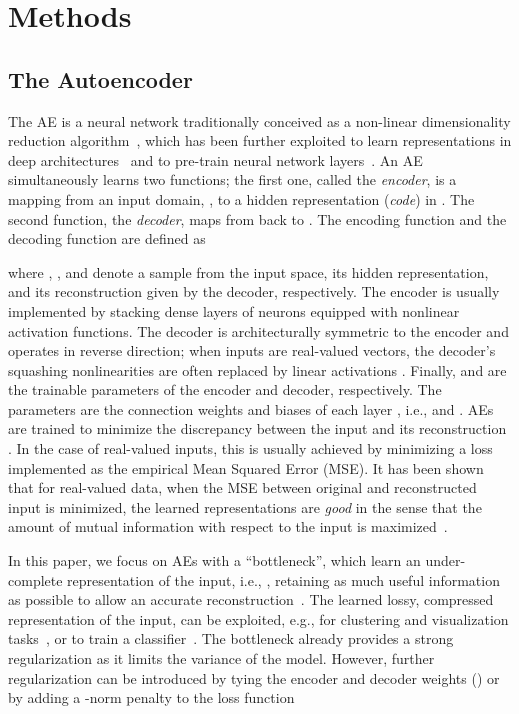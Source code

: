 \documentclass[a4paper,10pt,pdftex]{article}
\begin{document}
\section{Methods}
\label{sec:methods}

\subsection{The Autoencoder}
\label{sec:ae}

The AE is a neural network traditionally conceived as a non-linear dimensionality reduction algorithm~\cite{Hinton504}, which has been further exploited to learn representations in deep architectures~\cite{bengio2009learning} and to pre-train neural network layers~\cite{erhan2010does}.
An AE simultaneously learns two functions; the first one, called the \textit{encoder}, is a mapping from an input domain, , to a hidden representation (\textit{code}) in .
The second function, the \textit{decoder}, maps from  back to .
The encoding function  and the decoding function  are defined as

where , , and  denote a sample from the input space, its hidden representation, and its reconstruction given by the decoder, respectively.
The encoder  is usually implemented by stacking dense layers of neurons equipped with nonlinear activation functions.
The decoder  is architecturally symmetric to the encoder and operates in reverse direction; when inputs are real-valued vectors, the decoder's squashing nonlinearities are often replaced by linear activations \cite{vincent2010stacked}.
Finally,  and  are the trainable parameters of the encoder and decoder, respectively. 
The parameters are the connection weights and biases of each layer , i.e.,  and .
AEs are trained to minimize the discrepancy between the input  and its reconstruction .
In the case of real-valued inputs, this is usually achieved by minimizing a loss  implemented as the empirical Mean Squared Error (MSE).
It has been shown that for real-valued data, when the MSE between original and reconstructed input is minimized, the learned representations are \emph{good} in the sense that the amount of mutual information with respect to the input is maximized~\cite{vincent2010stacked}.



In this paper, we focus on AEs with a ``bottleneck'', which learn an under-complete representation of the input, i.e., , retaining as much useful information as possible to allow an accurate reconstruction~\cite{Hinton504}.
The learned lossy, compressed representation of the input, can be exploited, e.g., for clustering and visualization tasks~\cite{makhzani2015adversarial}, or to train a classifier~\cite{ng2016dual}.
The bottleneck already provides a strong regularization as it limits the variance of the model. However, further regularization can be introduced by tying the encoder and decoder weights () or by adding a -norm penalty to the loss function
\end{document}
